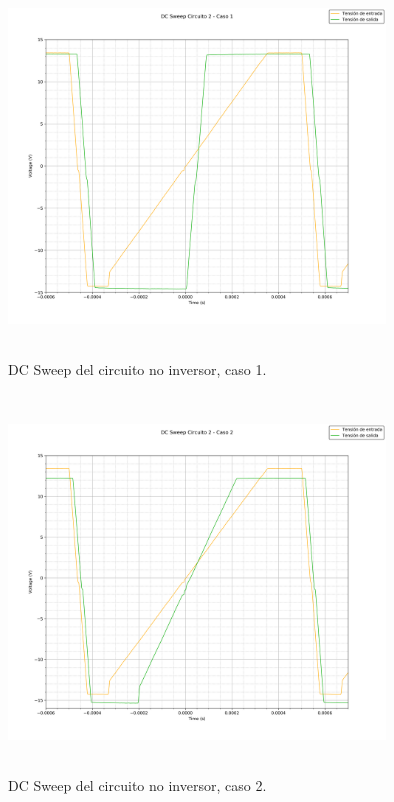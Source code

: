 \begin{figure}[H] %
	\centering
	\includegraphics[width=10cm,height=10cm,keepaspectratio]{../EJ1/00GRAFICOS/c2dcs/c2c1dcs.png}
	\caption{DC Sweep del circuito no inversor, caso 1.}
	\label{c2c1dcs}
\end{figure}

\begin{figure}[H] %
	\centering
	\includegraphics[width=10cm,height=10cm,keepaspectratio]{../EJ1/00GRAFICOS/c2dcs/c2c2dcs.png}
	\caption{DC Sweep del circuito no inversor, caso 2.}
	\label{c2c2dcs}
\end{figure}


